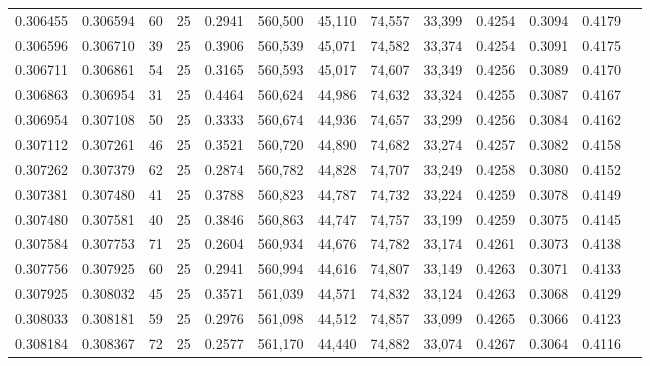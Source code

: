 \begin{tabular}{rrrrrrrrrrrrr}
0.306455 & 0.306594 &    60 &  25 &                                     0.2941 & 560,500 &  45,110 &  74,557 &  33,399 & 0.4254 & 0.3094 & 0.4179 \\
0.306596 & 0.306710 &    39 &  25 &                                     0.3906 & 560,539 &  45,071 &  74,582 &  33,374 & 0.4254 & 0.3091 & 0.4175 \\
0.306711 & 0.306861 &    54 &  25 &                                     0.3165 & 560,593 &  45,017 &  74,607 &  33,349 & 0.4256 & 0.3089 & 0.4170 \\
0.306863 & 0.306954 &    31 &  25 &                                     0.4464 & 560,624 &  44,986 &  74,632 &  33,324 & 0.4255 & 0.3087 & 0.4167 \\
0.306954 & 0.307108 &    50 &  25 &                                     0.3333 & 560,674 &  44,936 &  74,657 &  33,299 & 0.4256 & 0.3084 & 0.4162 \\
0.307112 & 0.307261 &    46 &  25 &                                     0.3521 & 560,720 &  44,890 &  74,682 &  33,274 & 0.4257 & 0.3082 & 0.4158 \\
0.307262 & 0.307379 &    62 &  25 &                                     0.2874 & 560,782 &  44,828 &  74,707 &  33,249 & 0.4258 & 0.3080 & 0.4152 \\
0.307381 & 0.307480 &    41 &  25 &                                     0.3788 & 560,823 &  44,787 &  74,732 &  33,224 & 0.4259 & 0.3078 & 0.4149 \\
0.307480 & 0.307581 &    40 &  25 &                                     0.3846 & 560,863 &  44,747 &  74,757 &  33,199 & 0.4259 & 0.3075 & 0.4145 \\
0.307584 & 0.307753 &    71 &  25 &                                     0.2604 & 560,934 &  44,676 &  74,782 &  33,174 & 0.4261 & 0.3073 & 0.4138 \\
0.307756 & 0.307925 &    60 &  25 &                                     0.2941 & 560,994 &  44,616 &  74,807 &  33,149 & 0.4263 & 0.3071 & 0.4133 \\
0.307925 & 0.308032 &    45 &  25 &                                     0.3571 & 561,039 &  44,571 &  74,832 &  33,124 & 0.4263 & 0.3068 & 0.4129 \\
0.308033 & 0.308181 &    59 &  25 &                                     0.2976 & 561,098 &  44,512 &  74,857 &  33,099 & 0.4265 & 0.3066 & 0.4123 \\
0.308184 & 0.308367 &    72 &  25 &                                     0.2577 & 561,170 &  44,440 &  74,882 &  33,074 & 0.4267 & 0.3064 & 0.4116 \\

\end{tabular}
